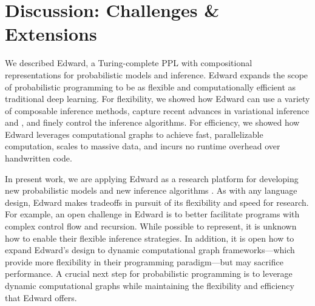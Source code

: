\section{Discussion: Challenges \& Extensions}
\label{sec:discussion}

We described Edward, a
Turing-complete \gls{PPL}
with compositional representations for probabilistic models and
inference.
Edward expands the scope of probabilistic programming to be as
flexible and
computationally efficient as traditional deep learning.
For flexibility, we showed how Edward can
use a variety of composable inference methods,
capture recent advances in
variational inference and , and
finely control the inference algorithms.
For efficiency, we showed how Edward leverages computational graphs to
achieve fast, parallelizable computation, scales to massive data, and
incurs no runtime overhead over handwritten code.

In present work, we are applying Edward as a research platform
for developing new probabilistic models
\citep{rudolph2016exponential,tran2017deep} and new
inference algorithms \citep{dieng2016chi}.
As with any language design, Edward makes tradeoffs in pursuit
of its flexibility and speed for research. For
example, an open challenge in Edward is to better facilitate programs
with complex control flow and recursion. While possible to represent,
it is unknown how to enable their flexible inference strategies. In
addition, it is open how to expand Edward's design to dynamic
computational graph frameworks---which provide more flexibility in
their programming paradigm---but may sacrifice performance. A crucial
next step for probabilistic programming is to leverage dynamic
computational graphs while maintaining the flexibility and
efficiency that Edward offers.


